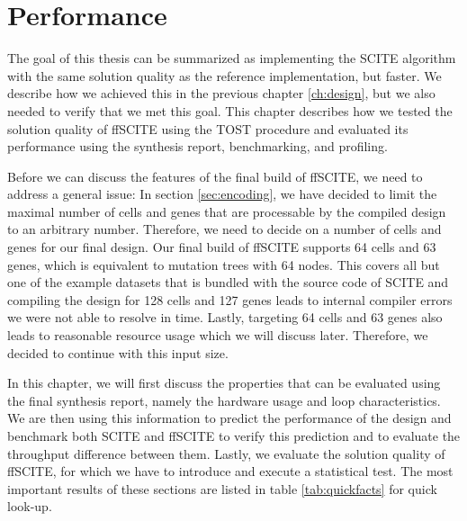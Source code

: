 \chapter{Performance}
\label{ch:performance}

The goal of this thesis can be summarized as implementing the \ac{SCITE} algorithm with the same solution quality as the reference implementation, but faster. We describe how we achieved this in the previous chapter \ref{ch:design}, but we also needed to verify that we met this goal. This chapter describes how we tested the solution quality of \ac{ffSCITE} using the \ac{TOST} procedure \cite{schuirmann1987comparison} and evaluated its performance using the synthesis report, benchmarking, and profiling. 

Before we can discuss the features of the final build of \ac{ffSCITE}, we need to address a general issue: In section \ref{sec:encoding}, we have decided to limit the maximal number of cells and genes that are processable by the compiled design to an arbitrary number. Therefore, we need to decide on a number of cells and genes for our final design. Our final build of \ac{ffSCITE} supports 64 cells and 63 genes, which is equivalent to mutation trees with 64 nodes. This covers all but one of the example datasets that is bundled with the source code of \ac{SCITE} and compiling the design for 128 cells and 127 genes leads to internal compiler errors we were not able to resolve in time. Lastly, targeting 64 cells and 63 genes also leads to reasonable resource usage which we will discuss later. Therefore, we decided to continue with this input size.

In this chapter, we will first discuss the properties that can be evaluated using the final synthesis report, namely the hardware usage and loop characteristics. We are then using this information to predict the performance of the design and benchmark both \ac{SCITE} and \ac{ffSCITE} to verify this prediction and to evaluate the throughput difference between them. Lastly, we evaluate the solution quality of \ac{ffSCITE}, for which we have to introduce and execute a statistical test. The most important results of these sections are listed in table \ref{tab:quickfacts} for quick look-up.

